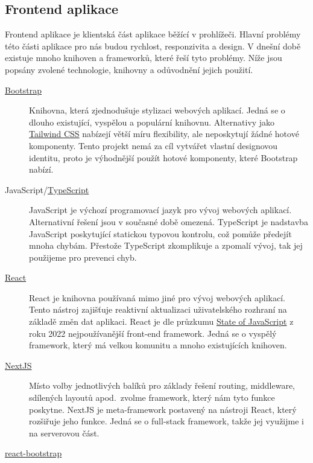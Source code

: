 \subsection{Frontend aplikace}\label{subsec:frontend-aplikace}

Frontend aplikace je klientská část aplikace běžící v prohlížeči.
Hlavní problémy této části aplikace pro nás budou rychlost, responzivita a design.
V dnešní době existuje mnoho knihoven a frameworků, které řeší tyto problémy.
Níže jsou popsány zvolené technologie, knihovny a odůvodnění jejich použití.

\begin{description}
    \item[\href{https://getbootstrap.com/}{Bootstrap}]
    Knihovna, která zjednodušuje stylizaci webových aplikací.
    Jedná se o dlouho existující, vyspělou a populární knihovnu.
    Alternativy jako \href{https://tailwindcss.com/}{Tailwind CSS} nabízejí větší míru flexibility, ale neposkytují žádné hotové komponenty.
    Tento projekt nemá za cíl vytvářet vlastní designovou identitu, proto je výhodnější použít hotové komponenty, které Bootstrap nabízí.
    \item[JavaScript/\href{https://www.typescriptlang.org/}{TypeScript}]
    JavaScript je výchozí programovací jazyk pro vývoj webových aplikací.
    Alternativní řešení jsou v současné době omezená.
    TypeScript je nadstavba JavaScript poskytující statickou typovou kontrolu, což pomůže předejít mnoha chybám.
    Přestože TypeScript zkomplikuje a zpomalí vývoj, tak jej použijeme pro prevenci chyb.
    \item[\href{https://react.dev/}{React}]
    React je knihovna používaná mimo jiné pro vývoj webových aplikací.
    Tento nástroj zajišťuje reaktivní aktualizaci uživatelského rozhraní na základě změn dat aplikaci.
    React je dle průzkumu \href{https://2023.stateofjs.com/en-US/libraries/front-end-frameworks/}{State of JavaScript} z roku 2022 nejpoužívanější front-end framework.
    Jedná se o vyspělý framework, který má velkou komunitu a mnoho existujících knihoven.
    \item[\href{https://nextjs.org/}{NextJS}]
    Místo volby jednotlivých balíků pro základy řešení routing, middleware, sdílených layoutů apod.\ zvolme framework, který nám tyto funkce poskytne.
    NextJS je meta-framework postavený na nástroji React, který rozšiřuje jeho funkce.
    Jedná se o full-stack framework, takže jej využijme i na serverovou část.
    \item[\href{https://react-bootstrap.github.io/}{react-bootstrap}]

\end{description}
